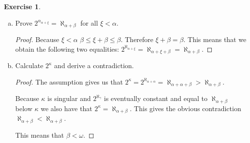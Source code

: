 \documentclass{article}
\theoremstyle{definition}
\newtheorem{question}{Exercise}
\DeclareMathOperator{\cof}{cf}
\begin{document}
\begin{question}
\begin{enumerate}[a.]
\begin{proof}
                  We get that \(\alpha\leq\aleph_{\alpha}\) because the
                  \(\aleph_{\alpha}\) functions are strictly increasing and
                  continuous by definition. We will show
                  \(\alpha+\alpha>\alpha\) to get
                  \(\aleph_{\alpha}<\aleph_{\alpha+\alpha}\) to get the required
                  inequality. Assume \(\alpha+\alpha=\alpha\), then
                  \[
                      \alpha+\beta=\alpha+\alpha+\beta>\alpha+\beta
                  \]
                  which is an obvious contradiction. Therefore
                  \[
                      \cof(\kappa)\leq\alpha\leq\aleph_{\alpha}<\aleph_{\alpha+\alpha}
                  \]
                  so \(\kappa\) is singular.
              \end{proof}

        \item Prove \(2^{\alpha_{\alpha+\xi}}=\aleph_{\alpha+\beta}\) for all
              \(\xi<\alpha\).

              \begin{proof}
                  Because \(\xi<\alpha\) \(\beta\leq\xi+\beta\leq\beta\).
                  Therefore \(\xi+\beta=\beta\). This means that we obtain the
                  following two equalities:
                  \(2^{\aleph_{\alpha+\xi}}=\aleph_{\alpha+\xi+\beta}=\aleph_{\alpha+\beta}\).
              \end{proof}

        \item Calculate \(2^{\kappa}\) and derive a contradiction.

              \begin{proof}
                  The assumption gives us that
                  \(2^{\kappa}=2^{\aleph_{\alpha+\alpha}}=\aleph_{\alpha+\alpha+\beta}>\aleph_{\alpha+\beta}\).

                  Because \(\kappa\) is singular and \(2^{\aleph_{\gamma}}\) is
                  eventually constant and equal to \(\aleph_{\alpha+\beta}\)
                  below \(\kappa\) we also have that
                  \(2^{\kappa}=\aleph_{\alpha+\beta}\). This gives the obvious
                  contradiction \(\aleph_{\alpha+\beta}<\aleph_{\alpha+\beta}\).

                  This means that \(\beta<\omega\).
              \end{proof}
    \end{enumerate}
\end{question}
\end{document}
